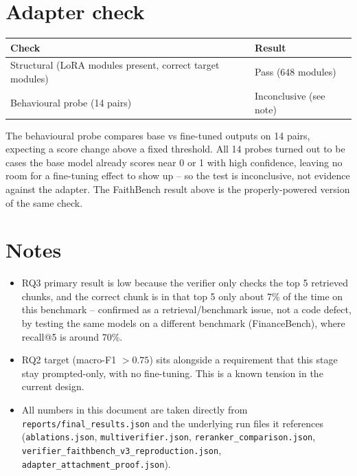 \documentclass[11pt]{article}
\begin{document}
\section*{Adapter check}
\begin{table}[h!]
\centering
\begin{tabular}{ll}
\toprule
Check & Result \\
\midrule
Structural (LoRA modules present, correct target modules) & Pass (648 modules) \\
Behavioural probe (14 pairs) & Inconclusive (see note) \\
\bottomrule
\end{tabular}
\end{table}
\noindent The behavioural probe compares base vs fine-tuned outputs on 14 pairs, expecting a
score change above a fixed threshold. All 14 probes turned out to be cases the base model
already scores near 0 or 1 with high confidence, leaving no room for a fine-tuning effect to
show up -- so the test is inconclusive, not evidence against the adapter. The FaithBench
result above is the properly-powered version of the same check.

\section*{Notes}
\begin{itemize}
\item RQ3 primary result is low because the verifier only checks the top 5 retrieved
  chunks, and the correct chunk is in that top 5 only about 7\% of the time on this
  benchmark -- confirmed as a retrieval/benchmark issue, not a code defect, by testing the
  same models on a different benchmark (FinanceBench), where recall@5 is around 70\%.
\item RQ2 target (macro-F1 $>0.75$) sits alongside a requirement that this stage stay
  prompted-only, with no fine-tuning. This is a known tension in the current design.
\item All numbers in this document are taken directly from \texttt{reports/final\_results.json}
  and the underlying run files it references (\texttt{ablations.json},
  \texttt{multiverifier.json}, \texttt{reranker\_comparison.json},
  \texttt{verifier\_faithbench\_v3\_reproduction.json}, \texttt{adapter\_attachment\_proof.json}).
\end{itemize}
\end{document}
